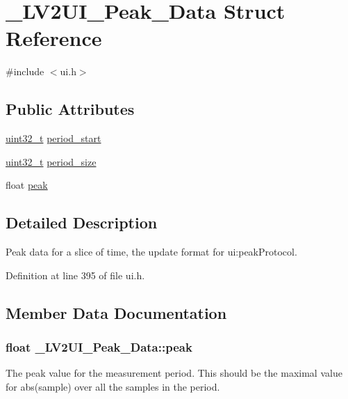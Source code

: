 \hypertarget{struct___l_v2_u_i___peak___data}{}\section{\+\_\+\+L\+V2\+U\+I\+\_\+\+Peak\+\_\+\+Data Struct Reference}
\label{struct___l_v2_u_i___peak___data}


{\ttfamily \#include $<$ui.\+h$>$}

\subsection*{Public Attributes}
\begin{DoxyCompactItemize}
\item 
\hyperlink{lib-src_2ffmpeg_2win32_2stdint_8h_a6eb1e68cc391dd753bc8ce896dbb8315}{uint32\+\_\+t} \hyperlink{struct___l_v2_u_i___peak___data_ae2b4f0e5b09a0ae11ffe24a120881839}{period\+\_\+start}
\item 
\hyperlink{lib-src_2ffmpeg_2win32_2stdint_8h_a6eb1e68cc391dd753bc8ce896dbb8315}{uint32\+\_\+t} \hyperlink{struct___l_v2_u_i___peak___data_abff5d80cd31d23bf30d3773d0066a5bb}{period\+\_\+size}
\item 
float \hyperlink{struct___l_v2_u_i___peak___data_a9bd4a5cc2f45f5922661b196c941ed23}{peak}
\end{DoxyCompactItemize}


\subsection{Detailed Description}
Peak data for a slice of time, the update format for ui\+:peak\+Protocol. 

Definition at line 395 of file ui.\+h.



\subsection{Member Data Documentation}
\subsubsection[{\texorpdfstring{peak}{peak}}]{\setlength{\rightskip}{0pt plus 5cm}float \+\_\+\+L\+V2\+U\+I\+\_\+\+Peak\+\_\+\+Data\+::peak}\hypertarget{struct___l_v2_u_i___peak___data_a9bd4a5cc2f45f5922661b196c941ed23}{}\label{struct___l_v2_u_i___peak___data_a9bd4a5cc2f45f5922661b196c941ed23}
The peak value for the measurement period. This should be the maximal value for abs(sample) over all the samples in the period. 

